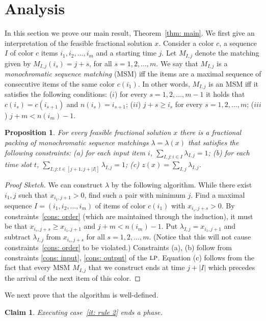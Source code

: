 \documentclass[11pt]{article}
\newtheorem{claim}[theorem]{Claim}
\newtheorem{proposition}[theorem]{Proposition}
\newenvironment{proofsketch}{\begin{proof}[Proof Sketch]}{\end{proof}}
\newcommand{\LP}{{\hbox{\sc lp}}}
\begin{document}
\section{Analysis}

In this section we prove our main result, Theorem~\ref{thm: main}.
We first give an interpretation of the feasible fractional solution $x$.
Consider a color $c$, a sequence $I$ of color $c$ items $i_1,i_2,\dots,i_m$
and a starting time $j$. Let $M_{I,j}$ denote the matching given by
$M_{I,j}(i_s) = j+s$, for all $s=1,2,\ldots,m$.
We say that $M_{I,j}$ is a {\em monochromatic sequence matching} (MSM)
iff the items are a maximal sequence of consecutive items of the same color $c(i_1)$.
In other words, $M_{I,j}$ is an MSM iff it
satisfies the following conditions:
($i$) for every $s=1,2,\ldots,m-1$ it holds that $c(i_s)=c(i_{s+1})$
and $n(i_{s})=i_{s+1}$;
($ii$) $j+s\geq i_s$ for every $s=1,2,\ldots,m$;
($iii$) $j+m< n(i_m)-1$.
\begin{proposition}\label{pr: packing sequences}
For every feasible fractional solution $x$ there is a fractional packing
of monochromatic sequence matchings $\lambda = \lambda(x)$
that satisfies the following constraints:
(a) for each input item $i$, $\sum_{I,j: i\in I} \lambda_{I,j} = 1$;
(b) for each time slot $t$, $\sum_{I,j: t \in [j+1, j+|I|]} \lambda_{I,j} = 1$;
(c) $z(x) = \sum_{I,j} \lambda_{I,j}$.
\end{proposition}

\begin{proofsketch}
We can construct $\lambda$ by the following algorithm.
While there exist $i_1,j$ such that $x_{i_1,j+1} > 0$, find
such a pair with minimum $j$. Find a maximal sequence
$I = (i_1,i_2,\dots,i_m)$ of items of color $c(i_1)$ with
$x_{i_s,j+s} > 0$. By constraints~\eqref{cons: order}
(which are maintained through the induction), it must
be that $x_{i_s,j+s} \ge x_{i_1,j+1}$ and $j+m < n(i_m) - 1$.
Put $\lambda_{I,j} = x_{i_1,j+1}$ and subtract $\lambda_{I,j}$
from $x_{i_s,j+s}$ for all $s=1,2,\dots,m$. (Notice that this
will not cause constraints~\eqref{cons: order} to be violated.)
Constraints (a), (b) follow from constraints \eqref{cons: input},
\eqref{cons: output} of the $\LP$. Equation (c) follows from
the fact that every MSM $M_{I,j}$ that we construct ends at
time $j+|I|$ which precedes the arrival of the next item of
this color.
\end{proofsketch}

We next prove that the algorithm is well-defined.
\begin{claim}\label{cl: rule 2}
Executing case~\ref{it: rule 2} ends a phase.
\end{claim}
\end{document}
